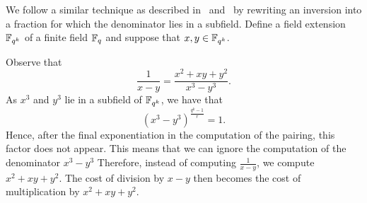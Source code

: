 We follow a similar technique as described in~\cite{2008/lin} and~\cite{2009/deg15}
by rewriting an inversion into a fraction for which the denominator lies in a subfield.
Define a field extension $\mathbb{F}_{q^k}$ of a finite field $\mathbb{F}_{q}$ and suppose that $x,y \in \mathbb{F}_{q^k}$.

Observe that
$$ \frac{1}{x-y} = \frac{x^2 + xy + y^2}{x^3 - y^3}. $$
As $x^3$ and $y^3$ lie in a subfield of $\mathbb{F}_{q^k}$, we have that
\[(x^{3} - y^{3})^{\frac{q^{k}-1}{r}} = 1.\]
Hence, after the final exponentiation in the computation of the pairing, this factor does not appear.
This means that we can ignore the computation of the denominator $x^3 - y^3$
Therefore, instead of computing $\frac{1}{x-y}$, we compute $x^2 + xy + y^2$.
The cost of division by $x - y$ then becomes the cost of multiplication by $x^2 + xy + y^2$.


